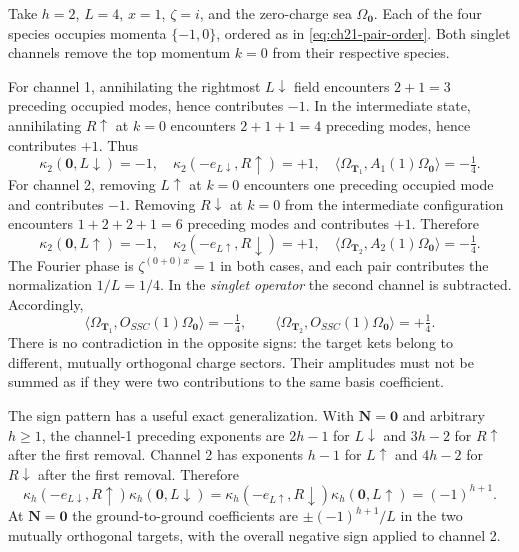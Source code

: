 \begin{example}[Four species, \(L=4\), and two opposite singlet coefficients]
\label{ex:ch21-pair-sign}
Take \(h=2\), \(L=4\), \(x=1\), \(\zeta=i\), and the zero-charge sea
\(\Omega_{\mathbf0}\).  Each of the four species occupies momenta
\(\{-1,0\}\), ordered as in \eqref{eq:ch21-pair-order}.
Both singlet channels remove the top momentum \(k=0\) from their
respective species.

For channel 1, annihilating the rightmost \(L\downarrow\) field
encounters \(2+1=3\) preceding occupied modes, hence contributes
\(-1\).  In the intermediate state, annihilating \(R\uparrow\) at
\(k=0\) encounters \(2+1+1=4\) preceding modes, hence contributes
\(+1\).  Thus
\begin{equation}
 \kappa_2(\mathbf0,L\downarrow)=-1,\quad
 \kappa_2(-e_{L\downarrow},R\uparrow)=+1,\quad
 \langle\Omega_{\mathbf T_1},A_1(1)\Omega_{\mathbf0}\rangle=-\tfrac14.
 \label{eq:ch21-pair-example-one}
\end{equation}
For channel 2, removing \(L\uparrow\) at \(k=0\) encounters one
preceding occupied mode and contributes \(-1\).  Removing
\(R\downarrow\) at \(k=0\) from the intermediate configuration
encounters \(1+2+2+1=6\) preceding modes and contributes \(+1\).
Therefore
\begin{equation}
 \kappa_2(\mathbf0,L\uparrow)=-1,\quad
 \kappa_2(-e_{L\uparrow},R\downarrow)=+1,\quad
 \langle\Omega_{\mathbf T_2},A_2(1)\Omega_{\mathbf0}\rangle=-\tfrac14.
 \label{eq:ch21-pair-example-two}
\end{equation}
The Fourier phase is \(\zeta^{(0+0)x}=1\) in both cases, and each
pair contributes the normalization \(1/L=1/4\).  In the \emph{singlet
operator} the second channel is subtracted.  Accordingly,
\begin{equation}
 \boxed{\quad
 \langle\Omega_{\mathbf T_1},O_{SSC}(1)\Omega_{\mathbf0}\rangle
   =-\tfrac14,\qquad
 \langle\Omega_{\mathbf T_2},O_{SSC}(1)\Omega_{\mathbf0}\rangle
   =+\tfrac14.\quad}
 \label{eq:ch21-pair-example-final}
\end{equation}
There is no contradiction in the opposite signs: the target kets
belong to different, mutually orthogonal charge sectors.  Their
amplitudes must not be summed as if they were two contributions to
the same basis coefficient.
\end{example}

The sign pattern has a useful exact generalization.  With
\(\mathbf N=\mathbf0\) and arbitrary \(h\geq1\), the channel-1
preceding exponents are \(2h-1\) for \(L\downarrow\) and
\(3h-2\) for \(R\uparrow\) after the first removal.  Channel 2 has
exponents \(h-1\) for \(L\uparrow\) and \(4h-2\) for
\(R\downarrow\) after the first removal.  Therefore
\begin{equation}
 \kappa_h(-e_{L\downarrow},R\uparrow)
 \kappa_h(\mathbf0,L\downarrow)
 =\kappa_h(-e_{L\uparrow},R\downarrow)
 \kappa_h(\mathbf0,L\uparrow)=(-1)^{h+1}.
 \label{eq:ch21-pair-general-sign}
\end{equation}
At \(\mathbf N=\mathbf0\) the ground-to-ground coefficients are
\(\pm(-1)^{h+1}/L\) in the two mutually orthogonal targets,
with the overall negative sign applied to channel 2.

